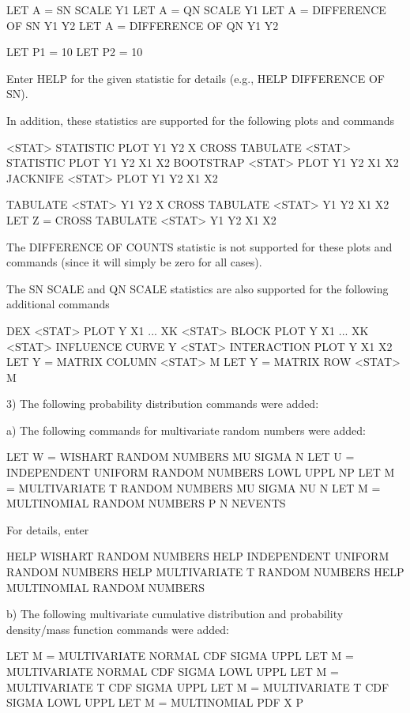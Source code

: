 {        LET A = SN SCALE Y1
        LET A = QN SCALE Y1
        LET A = DIFFERENCE OF SN Y1 Y2
        LET A = DIFFERENCE OF QN Y1 Y2

        LET P1 = 10
        LET P2 = 10

    Enter HELP for the given statistic for details (e.g.,
    HELP DIFFERENCE OF SN).

    In addition, these statistics are supported for the following
    plots and commands

       <STAT> STATISTIC PLOT Y1 Y2 X
       CROSS TABULATE <STAT> STATISTIC PLOT Y1 Y2 X1 X2
       BOOTSTRAP <STAT> PLOT Y1 Y2 X1 X2
       JACKNIFE <STAT> PLOT Y1 Y2 X1 X2

       TABULATE <STAT> Y1 Y2 X
       CROSS TABULATE <STAT> Y1 Y2 X1 X2
       LET Z = CROSS TABULATE <STAT> Y1 Y2 X1 X2

    The DIFFERENCE OF COUNTS statistic is not supported for these
    plots and commands (since it will simply be zero for all
    cases).
 
    The SN SCALE and QN SCALE statistics are also supported for
    the following additional commands

       DEX <STAT> PLOT Y X1 ... XK
       <STAT> BLOCK PLOT Y X1 ... XK
       <STAT> INFLUENCE CURVE Y
       <STAT> INTERACTION PLOT Y X1 X2
       LET Y = MATRIX COLUMN <STAT> M 
       LET Y = MATRIX ROW <STAT> M 

 3) The following probability distribution commands were added:

    a) The following commands for multivariate random numbers
       were added:

          LET W = WISHART RANDOM NUMBERS MU SIGMA N
          LET U = INDEPENDENT UNIFORM RANDOM NUMBERS LOWL UPPL NP
          LET M = MULTIVARIATE T RANDOM NUMBERS MU SIGMA NU N
          LET M = MULTINOMIAL RANDOM NUMBERS P N NEVENTS

       For details, enter

          HELP WISHART RANDOM NUMBERS
          HELP INDEPENDENT UNIFORM RANDOM NUMBERS
          HELP MULTIVARIATE T RANDOM NUMBERS
          HELP MULTINOMIAL RANDOM NUMBERS

     b) The following multivariate cumulative distribution and
        probability density/mass function commands were added:

           LET M = MULTIVARIATE NORMAL CDF SIGMA UPPL
           LET M = MULTIVARIATE NORMAL CDF SIGMA LOWL UPPL
           LET M = MULTIVARIATE T CDF SIGMA UPPL
           LET M = MULTIVARIATE T CDF SIGMA LOWL UPPL
           LET M = MULTINOMIAL PDF X P

}
